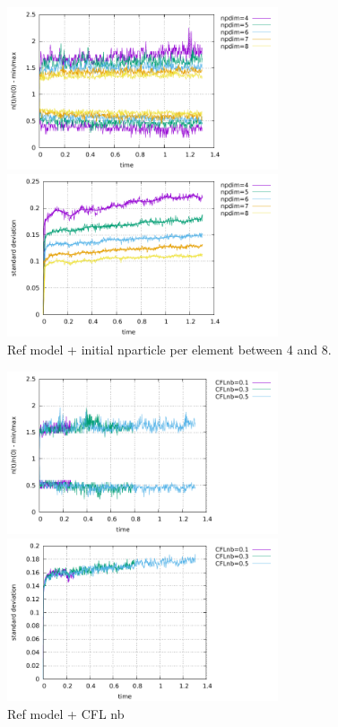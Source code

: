 \begin{center}
\includegraphics[width=8cm]{python_codes/fieldstone_30/results_box/markercount_npd}
\includegraphics[width=8cm]{python_codes/fieldstone_30/results_box/stdev_npd}\\
{\captionfont Ref model + initial nparticle per element between 4 and 8.}
\end{center}

\begin{center}
\includegraphics[width=8cm]{python_codes/fieldstone_30/results_box/markercount_cflnb}
\includegraphics[width=8cm]{python_codes/fieldstone_30/results_box/stdev_cflnb}\\
{\captionfont Ref model + CFL nb}
\end{center}

